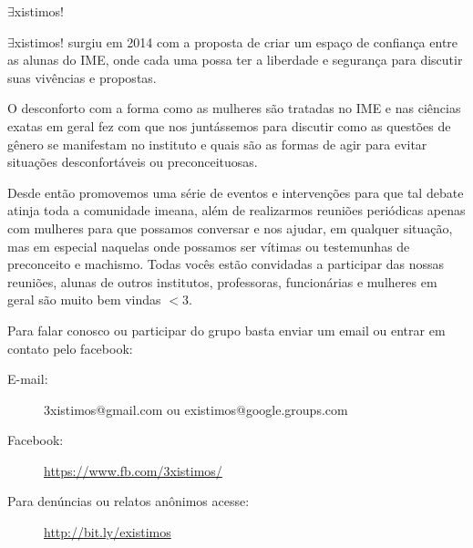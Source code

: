 \begin{subsecao}{$\exists$xistimos!}


$\exists$xistimos! surgiu em  2014 com a proposta de criar um espaço de
confiança entre as alunas do IME, onde cada uma possa ter a liberdade e
segurança para discutir suas vivências e propostas.

O desconforto com a forma como as mulheres são tratadas no IME e nas ciências
exatas em geral fez com que nos juntássemos para discutir como as questões de
gênero se manifestam no instituto e quais são as formas de agir para evitar
situações desconfortáveis ou preconceituosas.

Desde então promovemos uma série de eventos e intervenções para que tal debate
atinja toda a comunidade imeana, além de realizarmos reuniões periódicas apenas
com mulheres para que possamos conversar e nos ajudar, em qualquer situação,
mas em especial naquelas onde possamos ser vítimas ou testemunhas de preconceito e
machismo. Todas vocês estão convidadas a participar das nossas reuniões, 
alunas de outros institutos, professoras, funcionárias e mulheres
em geral são muito bem vindas $<$3. 

Para falar conosco ou participar do grupo basta enviar um email ou entrar em
contato pelo facebook:

\begin{description}
  \item[E-mail:] 3xistimos@gmail.com ou existimos@google.groups.com
  \item[Facebook:] \url{https://www.fb.com/3xistimos/}
  \item[Para denúncias ou relatos anônimos acesse:]
    \url{http://bit.ly/existimos}
\end{description}

\end{subsecao}
